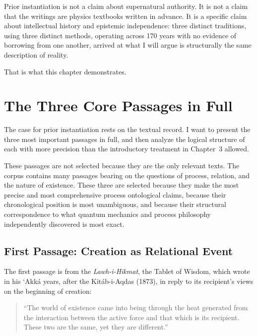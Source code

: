 Prior instantiation is not a claim about supernatural authority.
It is not a claim that the writings are physics textbooks written in advance.
It is a specific claim about intellectual history and epistemic independence:
three distinct traditions, using three distinct methods, operating across 170
years with no evidence of borrowing from one another, arrived at what I
will argue is structurally the same description of reality.

That is what this chapter demonstrates.


\section{The Three Core Passages in Full}
\label{sec:ch6-passages}

The case for prior instantiation rests on the textual record.
I want to present the three most important passages in full, and then analyze
the logical structure of each with more precision than the introductory treatment
in Chapter~3 allowed.

These passages are not selected because they are the only relevant texts.
The \bahai corpus contains many passages bearing on the questions of process,
relation, and the nature of existence.
These three are selected because they make the most precise and most comprehensive
process ontological claims, because their chronological position is most
unambiguous, and because their structural correspondence to what quantum mechanics
and process philosophy independently discovered is most exact.

\subsection{First Passage: Creation as Relational Event}

The first passage is from the \textit{Lawh-i-Hikmat}, the Tablet of Wisdom,
which \Bahaullah wrote in his `Akká years, after the Kitáb-i-Aqdas (1873), in
reply to its recipient's views on the beginning of creation:

\begin{quote}
``The world of existence came into being through the heat generated
from the interaction between the active force and that which is its recipient.
These two are the same, yet they are different.''
\citep[p.~140]{TabletsBahaullah}
\end{quote}

